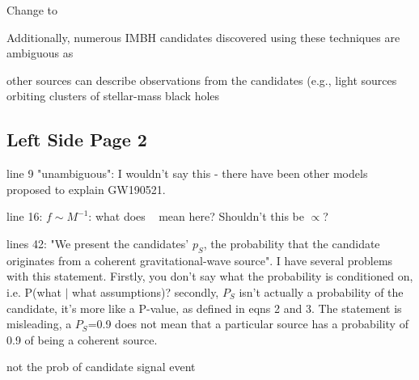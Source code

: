 \documentclass[11pt,leqno]{article}
\begin{document}
Change to 

Additionally, numerous IMBH candidates discovered using these techniques are ambiguous as 

other sources can describe observations from the candidates (e.g., light sources orbiting clusters of stellar-mass black holes 


\subsection*{Left Side Page 2} 
\begin{tcolorbox}[left = 1em, top = 1ex, bottom = 1ex, colupper=black, colback=black!10, adjusted title =  Comment 1]
    \setlength\parindent{2em}
	\noindent
	\ttfamily
    line 9 "unambiguous": I wouldn't say this - there have been other models proposed to explain GW190521.
\end{tcolorbox}


\begin{tcolorbox}[left = 1em, top = 1ex, bottom = 1ex, colupper=black, colback=black!10, adjusted title =  Comment 2]
    \setlength\parindent{2em}
	\noindent
	\ttfamily
    line 16: $f \sim M^{-1}$: what does ~ mean here? Shouldn't this be $\propto$?
\end{tcolorbox}



\begin{tcolorbox}[left = 1em, top = 1ex, bottom = 1ex, colupper=black, colback=black!10, adjusted title =  Comment 3]
    \setlength\parindent{2em}
	\noindent
	\ttfamily
    lines 42: "We present the candidates' $p_S$, the probability that the candidate originates from a coherent gravitational-wave source". I have several problems with this statement. Firstly, you don't say what the probability is conditioned on, i.e. P(what $|$ what assumptions)? secondly, $P_S$ isn't actually a probability of the candidate, it's more like a P-value, as defined in eqns 2 and 3. The statement is misleading, a $P_S$=0.9 does not mean that a particular source has a probability of 0.9 of being a coherent source.
\end{tcolorbox}




not the prob of candidate signal event 
\end{document}

